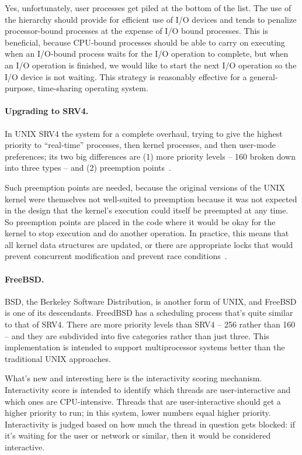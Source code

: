 Yes, unfortunately, user processes get piled at the bottom of the list. The use of the hierarchy should provide for efficient use of I/O devices and tends to penalize processor-bound processes at the expense of I/O bound processes. This is beneficial, because CPU-bound processes should be able to carry on executing when an I/O-bound process waits for the I/O operation to complete, but when an I/O operation is finished, we would like to start the next I/O operation so the I/O device is not waiting. This strategy is reasonably effective for a general-purpose, time-sharing operating system.

\paragraph{Upgrading to SRV4.}
In UNIX SRV4 the system for a complete overhaul, trying to give the highest priority to ``real-time'' processes, then kernel processes, and then user-mode preferences; its two big differences are (1) more priority levels -- 160 broken down into three types -- and (2) preemption points~\cite{osi}. 

Such preemption points are needed, because the original versions of the UNIX kernel were themselves not well-suited to preemption because it was not expected in the design that the kernel's execution could itself be preempted at any time. So preemption points are placed in the code where it would be okay for the kernel to stop execution and do another operation. In practice, this means that all kernel data structures are updated, or there are appropriate locks that would prevent concurrent modification and prevent race conditions~\cite{osi}. 

\paragraph{FreeBSD.}
BSD, the Berkeley Software Distribution, is another form of UNIX, and FreeBSD is one of its descendants. FreedBSD has a scheduling process that's quite similar to that of SRV4. There are more priority levels than SRV4 -- 256 rather than 160 -- and they are subdivided into five categories rather than just three. This implementation is intended to support multiprocessor systems better than the traditional UNIX approaches.

What's new and interesting here is the interactivity scoring mechanism. Interactivity score is intended to identify which threads are user-interactive and which ones are CPU-intensive. Threads that are user-interactive should get a higher priority to run; in this system, lower numbers equal higher priority. Interactivity is judged based on how much the thread in question gets blocked: if it's waiting for the user or network or similar, then it would be considered interactive.

